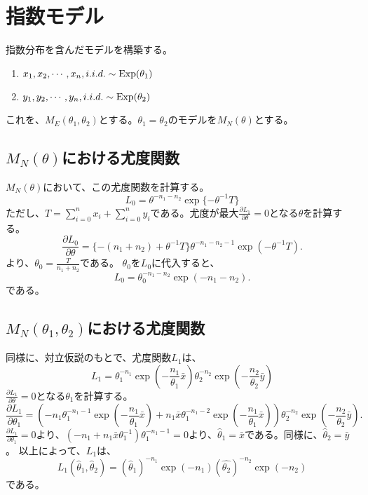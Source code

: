 \begin{comment}
 = (45-60*65/100)^2/(60*65/100)+(15-60*35/100)^2/(60*35/100)+(20-40*65/100)^2/(40*65/100) + (20-40*35/100)^2/(40*35/100)
 = 6.5934
\end{comment}

\section{指数モデル}
指数分布を含んだモデルを構築する。
\begin{enumerate}
 \item $x_1,x_2,\cdots,x_n,i.i.d. \sim \rm{Exp}(\theta_1)$
 \item $y_1,y_2,\cdots,y_n,i.i.d. \sim \rm{Exp}(\theta_2)$
\end{enumerate}
これを、$M_E(\theta_1,\theta_2)$とする。$\theta_1=\theta_2$のモデルを$M_N(\theta)$とする。
\subsection{$M_N(\theta)$における尤度関数}
$M_N(\theta)$において、この尤度関数を計算する。
\begin{equation*}
 L_{0} = \theta^{-n_1-n_2}\exp\{-\theta^{-1}T\}
\end{equation*}
ただし、$T=\sum_{i=0}^n x_i+\sum_{i=0}^n y_i$である。尤度が最大$\frac{\partial L_1}{\partial\theta}=0$となる$\theta$を計算する。
\begin{equation}
    \frac{\partial L_0}{\partial\theta} = \{ -(n_1+n_2)+\theta^{-1}T \}\theta^{-n_1-n_2-1}\exp(-\theta^{-1}T).
\end{equation}
より、$\theta_0=\frac{T}{n_1+n_2}$である。
$\theta_0$を$L_{0}$に代入すると、
\begin{equation}
    L_{0} = \theta_0^{-n_1-n_2}\exp(-n_1-n_2).
\end{equation}
である。

\subsection{$M_N(\theta_1,\theta_2)$における尤度関数}
同様に、対立仮説のもとで、尤度関数$L_{1}$は、
\begin{equation}
    L_{1} = \theta_1^{-n_1}\exp\left(-\frac{n_1}{\theta_1}\bar{x}\right)\theta_2^{-n_2}\exp\left(-\frac{n_2}{\theta_2}\bar{y}\right)
\end{equation}
$\frac{\partial L_1}{\partial\theta}=0$となる$\theta_1$を計算する。
\begin{equation}
    \frac{\partial L_1}{\partial\theta_1}=\left( -n_1\theta_1^{-n_1-1} \exp\left(-\frac{n_1}{\theta_1}\bar{x}\right)+n_1\bar{x}\theta_1^{-n_1-2}\exp\left(-\frac{n_1}{\theta_1}\bar{x}\right)\right)\theta_2^{-n_2}\exp\left(-\frac{n_2}{\theta_2}\bar{y}\right).
\end{equation}
$ \frac{\partial L_1}{\partial\theta_1}=0$より、$(-n_1+n_1\bar{x}\theta_1^{-1})\theta_1^{-n_1-1}=0$より、$\hat{\theta}_1=\bar{x}$である。同様に、$\hat{\theta}_2=\bar{y}$。
以上によって、$L_{1}$は、
\begin{equation}
    L_{1}(\hat{\theta}_1,\hat{\theta}_2) = (\hat{\theta}_1)^{-n_1}\exp(-n_1)(\hat{\theta_2})^{-n_2}\exp(-n_2)
\end{equation}
である。

